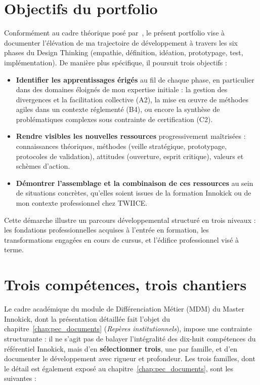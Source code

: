 \section{Objectifs du portfolio}

Conformément au cadre théorique posé par~\cite{tardif2006}, le présent portfolio vise à documenter l'élévation de ma trajectoire de développement à travers les six phases du Design Thinking (empathie, définition, idéation, prototypage, test, implémentation). De manière plus spécifique, il poursuit trois objectifs :

\begin{itemize}
    \item \textbf{Identifier les apprentissages érigés} au fil de chaque phase, en particulier dans des domaines éloignés de mon expertise initiale : la gestion des divergences et la facilitation collective (A2), la mise en œuvre de méthodes agiles dans un contexte réglementé (B4), ou encore la synthèse de problématiques complexes sous contrainte de certification (C2).
    \item \textbf{Rendre visibles les nouvelles ressources} progressivement maîtrisées : connaissances théoriques, méthodes (veille stratégique, prototypage, protocoles de validation), attitudes (ouverture, esprit critique), valeurs et schèmes d'action.
    \item \textbf{Démontrer l'assemblage et la combinaison de ces ressources} au sein de situations concrètes, qu'elles soient issues de la formation Innokick ou de mon contexte professionnel chez TWIICE.
\end{itemize}

Cette démarche illustre un parcours développemental structuré en trois niveaux : les fondations professionnelles acquises à l'entrée en formation, les transformations engagées en cours de cursus, et l'édifice professionnel visé à terme.

\section{Trois compétences, trois chantiers}
\label{sec:trois-competences-justification}

Le cadre académique du module de Différenciation Métier (MDM) du Master Innokick, dont la présentation détaillée fait l'objet du chapitre~\ref{chap:pec_documents} (\emph{Repères institutionnels}), impose une contrainte structurante : il ne s'agit pas de balayer l'intégralité des dix-huit compétences du référentiel Innokick, mais d'en \textbf{sélectionner trois}, une par famille, et d'en documenter le développement avec rigueur et profondeur. Les trois familles, dont le détail est également exposé au chapitre~\ref{chap:pec_documents}, sont les suivantes :

